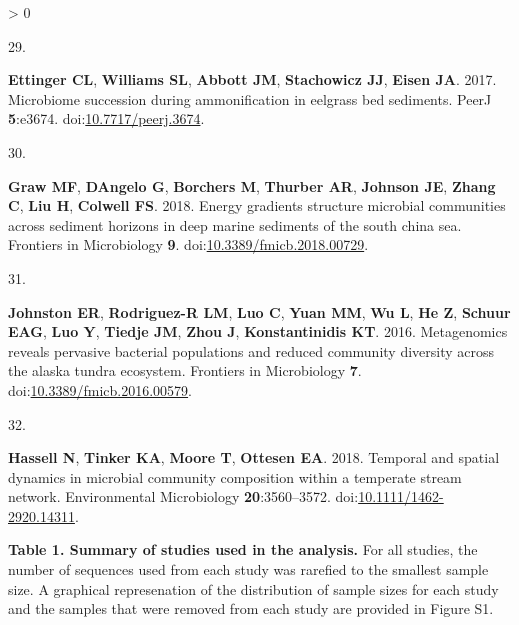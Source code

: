 \documentclass[
]{article}
\newlength{\cslhangindent}
\newlength{\csllabelwidth}
\newenvironment{CSLReferences}[3] %
 {%
  \setlength{\parindent}{0pt}
  \ifodd #1 \everypar{\setlength{\hangindent}{\cslhangindent}}\ignorespaces\fi
  \ifnum #2 > 0
  \setlength{\parskip}{#2\baselineskip}
  \fi
 }%
 {}
\newcommand{\CSLLeftMargin}[1]{\parbox[t]{\csllabelwidth}{#1}}
\newcommand{\CSLRightInline}[1]{\parbox[t]{\linewidth - \csllabelwidth}{#1}}
\begin{document}
\begin{CSLReferences}{0}{0}
\leavevmode\hypertarget{ref-Ettinger2017}{}%
\CSLLeftMargin{29. }
\CSLRightInline{\textbf{Ettinger CL}, \textbf{Williams SL},
\textbf{Abbott JM}, \textbf{Stachowicz JJ}, \textbf{Eisen JA}. 2017.
Microbiome succession during ammonification in eelgrass bed sediments.
{PeerJ} \textbf{5}:e3674.
doi:\href{https://doi.org/10.7717/peerj.3674}{10.7717/peerj.3674}.}

\leavevmode\hypertarget{ref-Graw2018}{}%
\CSLLeftMargin{30. }
\CSLRightInline{\textbf{Graw MF}, \textbf{DAngelo G}, \textbf{Borchers
M}, \textbf{Thurber AR}, \textbf{Johnson JE}, \textbf{Zhang C},
\textbf{Liu H}, \textbf{Colwell FS}. 2018. Energy gradients structure
microbial communities across sediment horizons in deep marine sediments
of the south china sea. Frontiers in Microbiology \textbf{9}.
doi:\href{https://doi.org/10.3389/fmicb.2018.00729}{10.3389/fmicb.2018.00729}.}

\leavevmode\hypertarget{ref-Johnston2016}{}%
\CSLLeftMargin{31. }
\CSLRightInline{\textbf{Johnston ER}, \textbf{Rodriguez-R LM},
\textbf{Luo C}, \textbf{Yuan MM}, \textbf{Wu L}, \textbf{He Z},
\textbf{Schuur EAG}, \textbf{Luo Y}, \textbf{Tiedje JM}, \textbf{Zhou
J}, \textbf{Konstantinidis KT}. 2016. Metagenomics reveals pervasive
bacterial populations and reduced community diversity across the alaska
tundra ecosystem. Frontiers in Microbiology \textbf{7}.
doi:\href{https://doi.org/10.3389/fmicb.2016.00579}{10.3389/fmicb.2016.00579}.}

\leavevmode\hypertarget{ref-Hassell2018}{}%
\CSLLeftMargin{32. }
\CSLRightInline{\textbf{Hassell N}, \textbf{Tinker KA}, \textbf{Moore
T}, \textbf{Ottesen EA}. 2018. Temporal and spatial dynamics in
microbial community composition within a temperate stream network.
Environmental Microbiology \textbf{20}:3560--3572.
doi:\href{https://doi.org/10.1111/1462-2920.14311}{10.1111/1462-2920.14311}.}

\end{CSLReferences}

\newpage

\textbf{Table 1. Summary of studies used in the analysis.} For all
studies, the number of sequences used from each study was rarefied to
the smallest sample size. A graphical represenation of the distribution
of sample sizes for each study and the samples that were removed from
each study are provided in Figure S1.

\small
\end{document}
